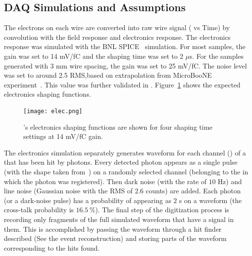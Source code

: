 \subsection{DAQ Simulations and Assumptions}
\label{sec:tools-mc-daq}


  The electrons on each wire are converted into raw wire signal ( vs Time) by convolution with the field response and electronics response. The  electronics response was simulated with the BNL SPICE~\cite{spice} simulation.  For most samples, the  gain was set to 14 mV/fC and the shaping time was set to 2 $\mu$s. For the samples generated with 3 mm wire spacing, the  gain was set to 25 mV/fC. The noise level was set to around 2.5  RMS,based on extrapolation 
  from MicroBooNE experiment~\cite{Acciarri:2017sde}. This value was further validated in . %
  Figure~\ref{elec_resp} shows the expected electronics shaping functions.

\begin{figure}[!h!tbp]
\centering
\texttt{[image: elec.png]}
\caption['s electronics shaping functions]{'s electronics shaping functions
are shown for four shaping time settings at 14 mV/fC gain.}
\label{elec_resp}
\end{figure}


The  electronics simulation separately generates waveform 
for each channel () of a  that has been hit by photons.
Every detected photon %
appears as a single \phel{} pulse
(with the shape taken from~\cite{http://lss.fnal.gov/archive/2015/pub/fermilab-pub-15-488-nd-ppd.pdf:2015gov}) on a randomly selected channel
(belonging to the  in which the photon was registered).
Then dark noise (with the rate of $10$ Hz) and 
line noise (Gaussian noise with the RMS of $2.6$  counts) are added.
Each photon (or a dark-noise pulse) has a probability of appearing
as $2$ \phel{}s on a waveform (the cross-talk probability is $16.5~\%$).
The final step of the digitization process is recording only fragments
of the full simulated waveform that have a signal in them.
This is accomplished by passing the waveform through a hit finder
described (See the event reconstruction)  
and storing parts of the waveform corresponding to the hits found.


